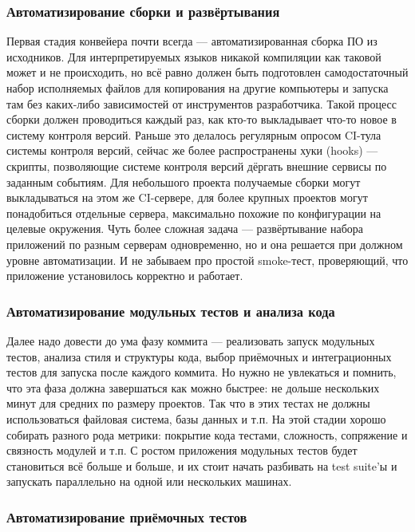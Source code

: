 \documentclass{../../text-style}
\begin{document}
\subsubsection{Автоматизирование сборки и развёртывания}

Первая стадия конвейера почти всегда --- автоматизированная сборка ПО из исходников. Для интерпретируемых языков никакой компиляции как таковой может и не происходить, но всё равно должен быть подготовлен самодостаточный набор исполняемых файлов для копирования на другие компьютеры и запуска там без каких-либо зависимостей от инструментов разработчика. Такой процесс сборки должен проводиться каждый раз, как кто-то выкладывает что-то новое в систему контроля версий. Раньше это делалось регулярным опросом CI-тула системы контроля версий, сейчас же более распространены хуки (hooks) --- скрипты, позволяющие системе контроля версий дёргать внешние сервисы по заданным событиям. Для небольшого проекта получаемые сборки могут выкладываться на этом же CI-сервере, для более крупных проектов могут понадобиться отдельные сервера, максимально похожие по конфигурации на целевые окружения. Чуть более сложная задача --- развёртывание набора приложений по разным серверам одновременно, но и она решается при должном уровне автоматизации. И не забываем про простой smoke-тест, проверяющий, что приложение установилось корректно и работает.

\subsubsection{Автоматизирование модульных тестов и анализа кода}

Далее надо довести до ума фазу коммита --- реализовать запуск модульных тестов, анализа стиля и структуры кода, выбор приёмочных и интеграционных тестов для запуска после каждого коммита. Но нужно не увлекаться и помнить, что эта фаза должна завершаться как можно быстрее: не дольше нескольких минут для средних по размеру проектов. Так что в этих тестах не должны использоваться файловая система, базы данных и т.п. На этой стадии хорошо собирать разного рода метрики: покрытие кода тестами, сложность, сопряжение и связность модулей и т.п. С ростом приложения модульных тестов будет становиться всё больше и больше, и их стоит начать разбивать на test suite’ы и запускать параллельно на одной или нескольких машинах.

\subsubsection{Автоматизирование приёмочных тестов}
\end{document}
